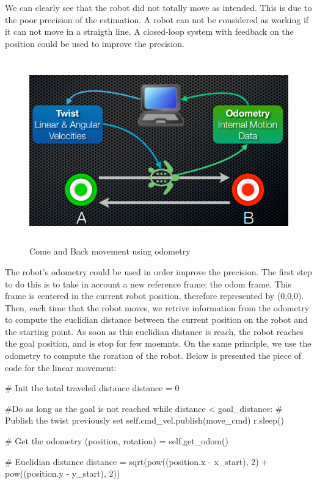 \documentclass[aps,letterpaper,11pt]{revtex4}
\begin{document}
We can clearly see that the robot did not totally move as intended. This is due to the poor precision of the estimation. A robot can not be considered as working if it can not move in a straigth line. A closed-loop system with feedback on the position could be used to improve the precision. 
\begin{figure}[H]
	\centering
	\includegraphics[height=8cm]{come-and-back-switch.png}
	\caption{Come and Back movement using odometry}
	\label{fig: Come and Back movement using odometry}    
\end{figure}
The robot's odometry could be used in order improve the precision. The first step to do this is to take in account a new reference frame: the odom frame. This frame is centered in the current robot position, therefore represented by (0,0,0). Then, each time that the robot moves, we retrive information from the odometry to compute the euclidian distance between the current position on the robot and the starting point. As soon as this euclidian distance is reach, the robot reaches the goal position, and is stop for few moemnts. On the same principle, we use the odometry to compute the roration of the robot. Below is presented the piece of code for the linear movement:

\begin{python}
	 # Init the total traveled distance
	 distance = 0
	 
            #Do as long as the goal is not reached
            while distance < goal_distance:
                # Publish the twist  previously set
                self.cmd_vel.publish(move_cmd)
                r.sleep()
        
                # Get the odometry
                (position, rotation) = self.get_odom()
                
                # Euclidian distance
                distance = sqrt(pow((position.x - x_start), 2) + 
                                pow((position.y - y_start), 2))
\end{python}
\end{document}
